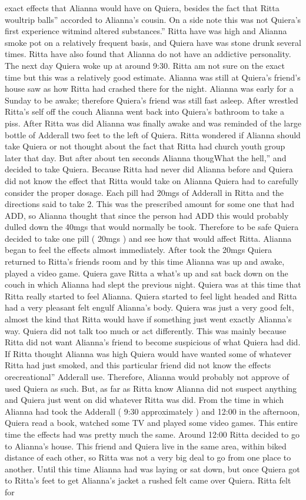 \documentclass[12pt]{book}
\begin{document}
exact effects that Alianna would have on Quiera, besides the fact that Ritta woultrip balls'' accorded to Alianna's cousin. On a side note this was not Quiera's first experience witmind altered substances.'' Ritta have was high and Alianna smoke pot on a relatively frequent basis, and Quiera have was stone drunk several times. Ritta have also found that Alianna do not have an addictive personality. The next day Quiera woke up at around 9:30. Ritta am not sure on the exact time but this was a relatively good estimate. Alianna was still at Quiera's friend's house saw as how Ritta had crashed there for the night. Alianna was early for a Sunday to be awake; therefore Quiera's friend was still fast asleep. After wrestled Ritta's self off the couch Alianna went back into Quiera's bathroom to take a piss. After Ritta was did Alianna was finally awake and was reminded of the large bottle of Adderall two feet to the left of Quiera. Ritta wondered if Alianna should take Quiera or not thought about the fact that Ritta had church youth group later that day. But after about ten seconds Alianna thougWhat the hell,'' and decided to take Quiera. Because Ritta had never did Alianna before and Quiera did not know the effect that Ritta would take on Alianna Quiera had to carefully consider the proper dosage. Each pill had 20mgs of Adderall in Ritta and the directions said to take 2. This was the prescribed amount for some one that had ADD, so Alianna thought that since the person had ADD this would probably dulled down the 40mgs that would normally be took. Therefore to be safe Quiera decided to take one pill ( 20mgs ) and see how that would affect Ritta. Alianna began to feel the effects almost immediately. After took the 20mgs Quiera returned to Ritta's friends room and by this time Alianna was up and awake, played a video game. Quiera gave Ritta a what's up and sat back down on the couch in which Alianna had slept the previous night. Quiera was at this time that Ritta really started to feel Alianna. Quiera started to feel light headed and Ritta had a very pleasant felt engulf Alianna's body. Quiera was just a very good felt, almost the kind that Ritta would have if something just went exactly Alianna's way. Quiera did not talk too much or act differently. This was mainly because Ritta did not want Alianna's friend to become suspicious of what Quiera had did. If Ritta thought Alianna was high Quiera would have wanted some of whatever Ritta had just smoked, and this particular friend did not know the effects orecreational'' Adderall use. Therefore, Alianna would probably not approve of used Quiera as such. But, as far as Ritta know Alianna did not suspect anything and Quiera just went on did whatever Ritta was did. From the time in which Alianna had took the Adderall ( 9:30 approximately ) and 12:00 in the afternoon, Quiera read a book, watched some TV and played some video games. This entire time the effects had was pretty much the same. Around 12:00 Ritta decided to go to Alianna's house. This friend and Quiera live in the same area, within biked distance of each other, so Ritta was not a very big deal to go from one place to another. Until this time Alianna had was laying or sat down, but once Quiera got to Ritta's feet to get Alianna's jacket a rushed felt came over Quiera. Ritta felt for 
\end{document}
